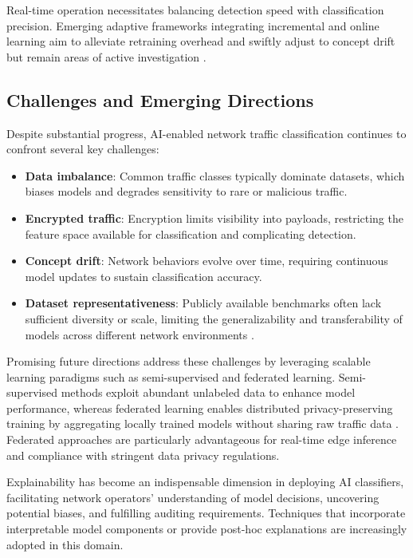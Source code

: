 Real-time operation necessitates balancing detection speed with classification precision. Emerging adaptive frameworks integrating incremental and online learning aim to alleviate retraining overhead and swiftly adjust to concept drift but remain areas of active investigation \cite{ref51}.

\subsection{Challenges and Emerging Directions}

Despite substantial progress, AI-enabled network traffic classification continues to confront several key challenges:

\begin{itemize}
    \item \textbf{Data imbalance}: Common traffic classes typically dominate datasets, which biases models and degrades sensitivity to rare or malicious traffic.
    \item \textbf{Encrypted traffic}: Encryption limits visibility into payloads, restricting the feature space available for classification and complicating detection.
    \item \textbf{Concept drift}: Network behaviors evolve over time, requiring continuous model updates to sustain classification accuracy.
    \item \textbf{Dataset representativeness}: Publicly available benchmarks often lack sufficient diversity or scale, limiting the generalizability and transferability of models across different network environments \cite{ref51}.
\end{itemize}

Promising future directions address these challenges by leveraging scalable learning paradigms such as semi-supervised and federated learning. Semi-supervised methods exploit abundant unlabeled data to enhance model performance, whereas federated learning enables distributed privacy-preserving training by aggregating locally trained models without sharing raw traffic data \cite{ref49,ref50,ref51}. Federated approaches are particularly advantageous for real-time edge inference and compliance with stringent data privacy regulations.

Explainability has become an indispensable dimension in deploying AI classifiers, facilitating network operators' understanding of model decisions, uncovering potential biases, and fulfilling auditing requirements. Techniques that incorporate interpretable model components or provide post-hoc explanations are increasingly adopted in this domain.

